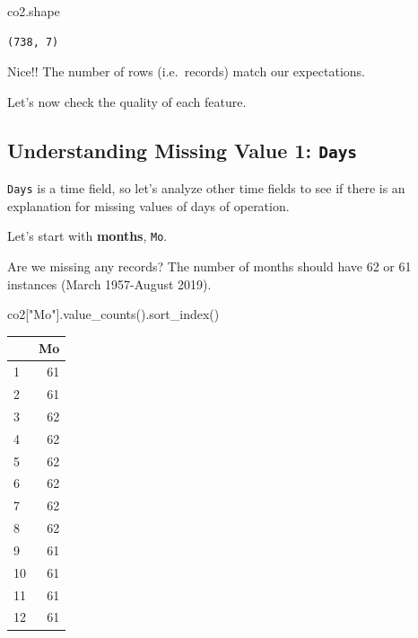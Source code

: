 \documentclass[
  letterpaper,
  DIV=11,
  numbers=noendperiod]{scrreprt}
\newenvironment{Shaded}{\begin{snugshade}}{\end{snugshade}}
\newcommand{\NormalTok}[1]{\textcolor[rgb]{0.00,0.23,0.31}{#1}}
\newcommand{\StringTok}[1]{\textcolor[rgb]{0.13,0.47,0.30}{#1}}
\begin{document}
\begin{Shaded}
\begin{Highlighting}[]
\NormalTok{co2.shape}
\end{Highlighting}
\end{Shaded}

\begin{verbatim}
(738, 7)
\end{verbatim}

Nice!! The number of rows (i.e.~records) match our expectations.

Let's now check the quality of each feature.

\hypertarget{understanding-missing-value-1-days}{%
\subsection{\texorpdfstring{Understanding Missing Value 1:
\texttt{Days}}{Understanding Missing Value 1: Days}}\label{understanding-missing-value-1-days}}

\texttt{Days} is a time field, so let's analyze other time fields to see
if there is an explanation for missing values of days of operation.

Let's start with \textbf{months}, \texttt{Mo}.

Are we missing any records? The number of months should have 62 or 61
instances (March 1957-August 2019).

\begin{Shaded}
\begin{Highlighting}[]
\NormalTok{co2[}\StringTok{"Mo"}\NormalTok{].value\_counts().sort\_index()}
\end{Highlighting}
\end{Shaded}

\begin{tabular}{lr}
\toprule
{} &  Mo \\
\midrule
1  &  61 \\
2  &  61 \\
3  &  62 \\
4  &  62 \\
5  &  62 \\
6  &  62 \\
7  &  62 \\
8  &  62 \\
9  &  61 \\
10 &  61 \\
11 &  61 \\
12 &  61 \\
\bottomrule
\end{tabular}
\end{document}
